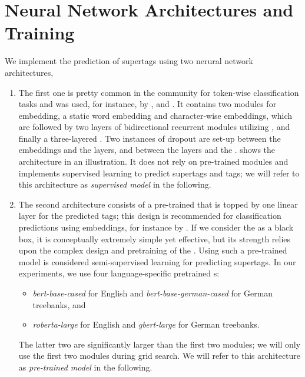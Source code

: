 \documentclass[../../document.tex]{subfiles}
\begin{document}
    \section{Neural Network Architectures and Training}\label{sec:models}
    We implement the prediction of supertags using two nerural network architectures, 
    \begin{enumerate}
        \item
            The first one is pretty common in the  community for token-wise classification tasks and was used, for instance, by \citet{vaswani2016supertagging}, \citet{StaSte20} and \citet{Cor20}.
            It contains two modules for embedding, a static word embedding and character-wise embeddings, which are followed by two layers of bidirectional recurrent modules utilizing , and finally a three-layered .
            Two instances of dropout are set-up between the embeddings and the  layers, and between the  layers and the .
             shows the architecture in an illustration.
            It does not rely on pre-trained modules and implements supervised learning to predict supertags and  tags; we will refer to this architecture as \emph{supervised model} in the following.
        \item
            The second architecture consists of a pre-trained  that is topped by one linear layer for the predicted tags; this design is recommended for classification predictions using  embeddings, for instance by \citet{Devlin2019}.
            If we consider the  as a black box, it is conceptually extremely simple yet effective, but its strength relies upon the complex design and pretraining of the .
            Using such a pre-trained model is considered semi-supervised learning for predicting supertags.
            In our experiments, we use four language-specific pretrained s:
            \begin{itemize}
                \item \emph{bert-base-cased} for English and \emph{bert-base-german-cased} \citep{Devlin2019} for German treebanks, and
                \item \emph{roberta-large} \citep{roberta} for English and \emph{gbert-large} \citep{Cha20} for German treebanks.
            \end{itemize}
            The latter two are significantly larger than the first two modules; we will only use the first two modules during grid search.
            We will refer to this architecture as \emph{pre-trained model} in the following.
    \end{enumerate}
\end{document}
